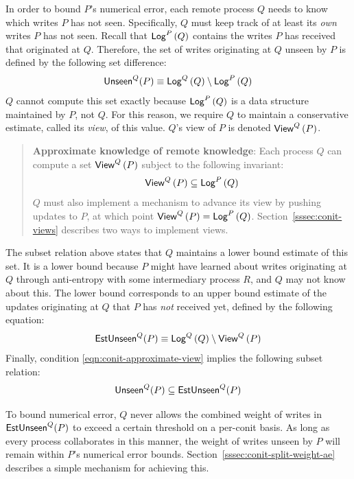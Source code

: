 \documentclass[]             %
{NASA}                       %
\theoremstyle{definition}
\begin{document}
In order to bound $P$'s numerical error, each remote process $Q$ needs
to know which writes $P$ has not seen. Specifically, $Q$ must keep
track of at least its \emph{own} writes $P$ has not seen. Recall that
$\mathsf{Log}^{P}\left(Q\right)$ contains the writes $P$ has received that originated at
$Q$. Therefore, the set of writes originating at $Q$ unseen by $P$ is
defined by the following set difference:
\begin{equation}
  \mathsf{Unseen}^{Q}{\left(P\right)} \equiv \mathsf{Log}^{Q}\left(Q\right) \setminus \mathsf{Log}^{P}\left(Q\right)
\end{equation}
$Q$ cannot compute this set exactly because $\mathsf{Log}^{P}\left(Q\right)$ is a data
structure maintained by $P$, not $Q$. For this reason, we require $Q$
to maintain a conservative estimate, called its \emph{view}, of this
value. $Q$'s view of $P$ is denoted $\mathsf{View}^{Q}\left(P\right)$.
\begin{quote}
  \textbf{Approximate knowledge of remote knowledge}: Each process $Q$
  can compute a set $\mathsf{View}^{Q}\left(P\right)$ subject to the following invariant:
  \begin{equation}
    \mathsf{View}^{Q}\left(P\right) \subseteq \mathsf{Log}^{P}\left(Q\right)  \label{eqn:conit-approximate-view}
  \end{equation}
  $Q$ must also implement a mechanism to advance its view by pushing
  updates to $P$, at which point $\mathsf{View}^{Q}\left(P\right) =
  \mathsf{Log}^{P}\left(Q\right)$. Section~\ref{sssec:conit-views} describes two ways to
  implement views.
\end{quote}
The subset relation above states that $Q$ maintains a lower bound
estimate of this set. It is a lower bound because $P$ might have
learned about writes originating at $Q$ through anti-entropy with some
intermediary process $R$, and $Q$ may not know about this. The lower
bound corresponds to an upper bound estimate of the updates
originating at $Q$ that $P$ has \emph{not} received yet, defined by the
following equation:
\begin{equation}
  \mathsf{EstUnseen}^{Q}{\left(P\right)} \equiv \mathsf{Log}^{Q}\left(Q\right) \setminus \mathsf{View}^{Q}\left(P\right)
\end{equation}
\noindent Finally, condition \eqref{eqn:conit-approximate-view} implies the
following subset relation:
\begin{equation}
  \mathsf{Unseen}^{Q}{\left(P\right)} \subseteq \mathsf{EstUnseen}^{Q}{\left(P\right)}
\end{equation}

To bound numerical error, $Q$ never allows the combined weight of
writes in $\mathsf{EstUnseen}^{Q}{\left(P\right)}$ to exceed a certain
threshold on a per-conit basis. As long as every process collaborates
in this manner, the weight of writes unseen by $P$ will remain within
$P$'s numerical error
bounds. Section~\ref{sssec:conit-split-weight-ae} describes a simple
mechanism for achieving this.
\end{document}
